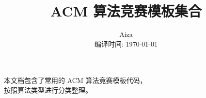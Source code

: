 \documentclass[10pt,landscape,twocolumn]{ctexart}
\title{\LARGE\textbf{ACM 算法竞赛模板集合}}
\author{\large Aiza \\ \normalsize 编译时间: \today}
\date{}
\begin{document}
\onecolumn
\maketitle

\vspace{2cm}
\begin{center}
\large
本文档包含了常用的 ACM 算法竞赛模板代码，\\
按照算法类型进行分类整理。

\end{center}

\newpage

\twocolumn
\vspace*{-1.5cm}
\tableofcontents
\vspace*{-1cm}
\newpage

\end{document}
